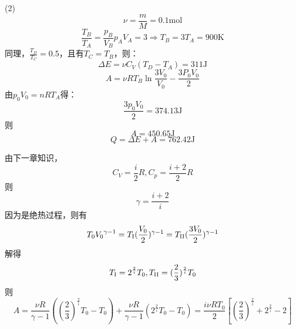 (2)%
\[\nu  = \frac{m}{M} = 0.1\mathrm{mol}\]
\[\frac{T_B}{T_A}=\frac{p_B}{V_B}{p_A}{V_A} = 3 \Rightarrow {T_B} = 3{T_A} = 900\mathrm{K}\]
同理，$\frac{T_D}{T_C}=0.5$，且有$T_C=T_B$，则：
\[\Delta E =\nu {C_V}({T_D}-{T_A})= 311\mathrm{J}\]
\[A =\nu R{T_B}\ln \frac{3{V_0}}{V_0}-\frac{{3P_0V_0}}{2}\]
由${p_0}{V_0} = nR{T_A}$得：
\[\frac{{3{p_0}{V_0}}}{2} = 374.13\mathrm{J}\]
则\[A = 450.65\mathrm{J}\]
\[Q = \Delta E+A = 762.42\mathrm{J}\]

\exercise

\solve 由下一章知识，\[{C_V} = \frac{i}{2}R,{C_p} = \frac{{i + 2}}{2}R\]
则
\[\gamma=\frac{{i + 2}}{i}\]
因为是绝热过程，则有
\[{T_0}{V_0}^{\gamma-1}={T_\text{\RNum{1}}}{(\frac{V_0}{2})^{\gamma-1}}= {T_\text{\RNum{2}}}{(\frac{{3{V_0}}}{2})^{\gamma-1}}\]
解得
\[{T_\text{\RNum{1}}} = {2^{\frac{2}{i}}}{T_0},{T_\text{\RNum{2}}} = {(\frac{2}{3})^{\frac{2}{i}}}{T_0}\]
则
\[A = \frac{{\nu R}}{{\gamma-1}}({(\frac{2}{3})^{\frac{2}{i}}}{T_0} - {T_0}) + \frac{{\nu R}}{{\gamma  - 1}}({2^{\frac{2}{i}}}{T_0}-{T_0}) = \frac{{i\nu R{T_0}}}{2}[{(\frac{2}{3})^{\frac{2}{i}}} + {2^{\frac{2}{i}}} - 2]\]